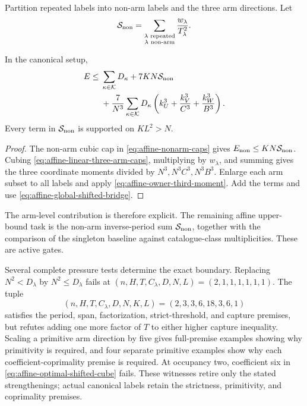 Partition repeated labels into non-arm labels and the three arm directions.
Let
\[
 \mathcal S_{\rm non}
 =\sum_{\substack{\lambda\text{ repeated}\\
                   \lambda\text{ non-arm}}}
   \frac{w_\lambda}{T_\lambda^2}.
\]

\begin{theorem}
\label{thm:affine-global-signed-energy-ceiling}
In the canonical setup,
\begin{align}
 E\le{}&\sum_{\kappa\in\mathcal K}D_\kappa
       +7KN\mathcal S_{\rm non}\notag\\
 &+\frac7{N^3}\sum_{\kappa\in\mathcal K}D_\kappa
   \left(k_U^3+\frac{k_V^3}{C^3}+\frac{k_W^3}{B^3}\right).
\label{eq:affine-global-signed-energy-ceiling}
\end{align}
Every term in $\mathcal S_{\rm non}$ is supported on $KL^2>N$.
\end{theorem}

\begin{proof}
The non-arm cubic cap in \eqref{eq:affine-nonarm-caps} gives
$E_{\rm non}\le KN\mathcal S_{\rm non}$.  Cubing
\eqref{eq:affine-linear-three-arm-caps}, multiplying by $w_\lambda$, and
summing gives the three coordinate moments divided by
$N^3,N^3C^3,N^3B^3$.  Enlarge each arm subset to all labels and apply
\eqref{eq:affine-owner-third-moment}.  Add the terms and use
\eqref{eq:affine-global-shifted-bridge}.
\end{proof}

The arm-level contribution is therefore explicit.  The remaining affine
upper-bound task is the non-arm inverse-period sum
$\mathcal S_{\rm non}$, together with the comparison of the singleton
baseline against catalogue-class multiplicities.  These are active gates.

Several complete pressure tests determine the exact boundary.  Replacing
$N^2<D_\lambda$ by $N^2\le D_\lambda$ fails at
$(n,H,T,C_\lambda,D,N,L)=(2,1,1,1,1,1,1)$.  The tuple
\[
 (n,H,T,C_\lambda,D,N,K,L)=(2,3,3,6,18,3,6,1)
\]
satisfies the period, span,
factorization, strict-threshold,
and capture premises, but refutes adding one more factor of $T$ to either
higher capture inequality.  Scaling a primitive arm direction by five gives
full-premise examples showing why primitivity is required, and four separate
primitive examples show why each coefficient-coprimality premise is required.
At occupancy two, coefficient six in
\eqref{eq:affine-optimal-shifted-cube} fails.  These witnesses retire only
the stated strengthenings; actual canonical labels retain the strictness,
primitivity, and coprimality premises.

